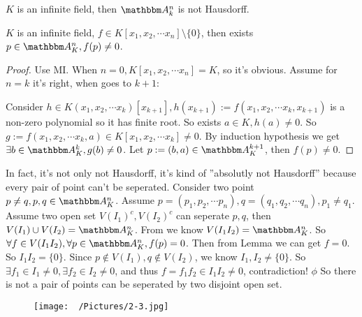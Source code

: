 \documentclass{ctexart}
\begin{document}
\begin{problem}
  $K$ is an infinite field, then $\A_k^n$ is not Hausdorff.
\end{problem}
\begin{solution}
  \begin{lemma}
    \label{lem:2}
    $K$ is an infinite field, $f\in K[x_1,x_2,\cdots x_n]\setminus \{0\}$, then exists $p\in \A_K^n,f(p)\neq 0$.
  \end{lemma}
  \begin{proof}
    Use MI. When $n=0,K[x_1,x_2,\cdots x_n]=K$, so it's obvious. Assume for $n=k$ it's right, when goes to $k+1$:

    Consider $h\in K(x_1,x_2,\cdots x_k)[x_{k+1}],h(x_{k+1}):=f(x_1,x_2,\cdots x_k,x_{k+1})$ is a non-zero polynomial so it has finite root. So exists $a\in K,h(a)\neq 0$. So $g:=f(x_1,x_2,\cdots x_k,a)\in K[x_1,x_2,\cdots x_k]\neq 0$.
    By induction hypothesis we get $\exists b\in \A_K^k,g(b)\neq 0$. Let $p:=(b,a)\in \A_K^{k+1}$, then $f(p)\neq 0$.
  \end{proof}
  In fact, it's not only not Hausdorff, it's kind of ''absolutly not Hausdorff'' because every pair of point can't be seperated.
  Consider two point $p\neq q,p,q\in \A_K^n$.
  Assume $p=(p_1,p_2,\cdots p_n),q=(q_1,q_2,\cdots q_n),p_1\neq q_1$. Assume two open set $V(I_1)^c,V(I_2)^c$ can seperate $p,q$, then $V(I_1)\cup V(I_2)=\A_K^n$.
  From  we know $V(I_1I_2)=\A_K^n$. So $\forall f\in V(I_1I_2),\forall p\in \A_K^n,f(p)=0$.
  Then from Lemma we can get $f=0$. So $I_1I_2=\{0\}$.
  Since $p\notin V(I_1),q\notin V(I_2)$, we know $I_1,I_2\neq \{0\}$. So $\exists f_1\in I_1\neq 0,\exists f_2\in I_2\neq 0$, and thus $f=f_1f_2\in I_1I_2\neq 0$, contradiction!
  \(\phi\)
  So there is not a pair of points can be seperated by two disjoint open set.
\end{solution}
\begin{figure}
  \centering
  \texttt{[image: ~/Pictures/2-3.jpg]}%

\end{figure}
\end{document}
